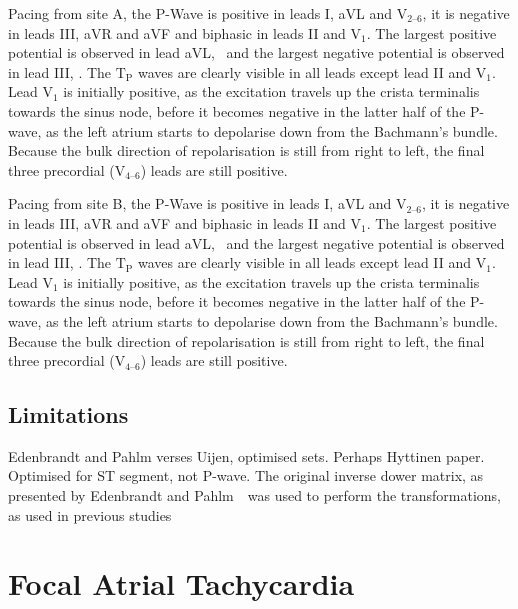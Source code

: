 Pacing from site A, the P-Wave is positive in leads I, aVL and
$\text{V}_{\text{2--6}}$, it is negative in leads III, aVR and aVF and biphasic
in leads II and $\text{V}_{\text{1}}$.
The largest positive potential is observed in lead aVL, \ and the
largest negative potential is observed in lead III, .
The $\text{T}_{\text{P}}$ waves are clearly visible in all leads except lead II
and $\text{V}_{\text{1}}$.
Lead $\text{V}_{\text{1}}$ is initially positive, as the excitation travels up
the crista terminalis towards the sinus node, before it becomes negative in the
latter half of the P-wave, as the left atrium starts to depolarise down from the
Bachmann's bundle.
Because the bulk direction of repolarisation is still from right to left, the
final three precordial ($\text{V}_{\text{4--6}}$) leads are still positive.


Pacing from site B, the P-Wave is positive in leads I, aVL and
$\text{V}_{\text{2--6}}$, it is negative in leads III, aVR and aVF and biphasic
in leads II and $\text{V}_{\text{1}}$.
The largest positive potential is observed in lead aVL, \ and the
largest negative potential is observed in lead III, .
The $\text{T}_{\text{P}}$ waves are clearly visible in all leads except lead II
and $\text{V}_{\text{1}}$.
Lead $\text{V}_{\text{1}}$ is initially positive, as the excitation travels up
the crista terminalis towards the sinus node, before it becomes negative in the
latter half of the P-wave, as the left atrium starts to depolarise down from the
Bachmann's bundle.
Because the bulk direction of repolarisation is still from right to left, the
final three precordial ($\text{V}_{\text{4--6}}$) leads are still positive.








\subsection{Limitations}

Edenbrandt and Pahlm verses Uijen, optimised sets.  Perhaps Hyttinen paper.
Optimised for ST segment, not P-wave.
The original inverse dower matrix, as presented by Edenbrandt and
Pahlm~\cite{Edenbrandt1988}\ was used to perform the transformations, as used in
previous studies~\cite{Carlson2005,Holmqvist2007,Havmoller2007}

\section{Focal Atrial Tachycardia}

